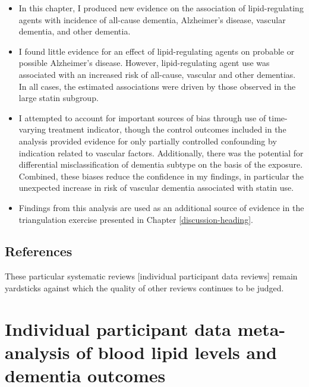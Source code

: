 \documentclass[a4paper, twoside]{templates/ociamthesis}
\begin{document}
\begin{itemize}
\item
  In this chapter, I produced new evidence on the association of lipid-regulating agents with incidence of all-cause dementia, Alzheimer's disease, vascular dementia, and other dementia.
\item
  I found little evidence for an effect of lipid-regulating agents on probable or possible Alzheimer's disease. However, lipid-regulating agent use was associated with an increased risk of all-cause, vascular and other dementias. In all cases, the estimated associations were driven by those observed in the large statin subgroup.
\item
  I attempted to account for important sources of bias through use of time-varying treatment indicator, though the control outcomes included in the analysis provided evidence for only partially controlled confounding by indication related to vascular factors. Additionally, there was the potential for differential misclassification of dementia subtype on the basis of the exposure. Combined, these biases reduce the confidence in my findings, in particular the unexpected increase in risk of vascular dementia associated with statin use.
\item
  Findings from this analysis are used as an additional source of evidence in the triangulation exercise presented in Chapter \ref{discussion-heading}.
\end{itemize}

\newpage

\hypertarget{references-2}{%
\section{References}\label{references-2}}

\begin{savequote}
These particular systematic reviews {[}individual participant data
reviews{]} remain yardsticks against which the quality of other reviews
continues to be judged.
\end{savequote}



\hypertarget{ipd-heading}{%
\chapter{Individual participant data meta-analysis of blood lipid levels and dementia outcomes}\label{ipd-heading}}
\end{document}

